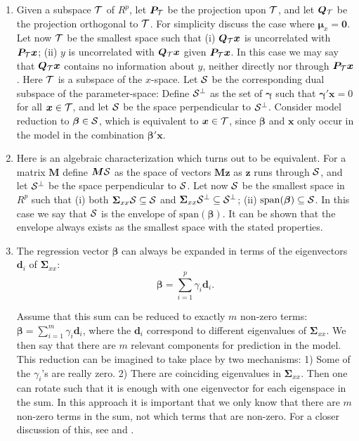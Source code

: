 \documentclass[a4paper, 11pt]{article}
\begin{document}
\begin{enumerate}[label=\Alph*.]

\item Given a subspace $\cal{T}$ of $R^p$, let $\bm{P}_{\cal{T}}$ be the projection upon $\cal{T}$, and let $\bm{Q}_{\cal{T}}$ be the projection orthogonal to $\cal{T}$. For simplicity discuss the case where $\bm{\mu}_x =\bm{0}$. Let now $\cal{T}$ be the smallest space such that (i) $\bm{Q}_{\cal{T}}\bm{x}$ is uncorrelated with $\bm{P}_{\cal{T}}\bm{x}$; (ii) $y$ is uncorrelated with $\bm{Q}_{\cal{T}}\bm{x}$ given $\bm{P}_{\cal{T}}\bm{x}$. In this case we may say that $\bm{Q}_{\cal{T}}\bm{x}$ contains no information about $y$, neither directly nor through $\bm{P}_{\cal{T}}\bm{x}$. Here $\cal{T}$ is a subspace of the $x$-space. Let $\cal{S}$ be the corresponding dual subspace of the parameter-space: Define $\cal{S}^\perp$ as the set of $\bm{\gamma}$ such that $\bm{\gamma}'\bm{x}=0$ for all $\bm{x}\in\cal{T}$, and let $\cal{S}$ be the space perpendicular to $\cal{S}^\perp$. Consider model reduction to $\bm{\beta}\in\cal{S}$, which is equivalent to $\bm{x}\in \cal{T}$, since $\bm{\beta}$ and $\bm{x}$ only occur in the model in the combination $\bm{\beta}'\bm{x}$.
  \smallskip

\item  Here is an algebraic characterization which turns out to be equivalent. For a matrix $\bm{M}$ define $\bm{M}\cal{S}$ as the space of vectors $\bm{Mz}$ as $\bm{z}$ runs through $\cal{S}$, and let $\cal{S}^\perp$ be
  the space perpendicular to $\cal{S}$. Let now $\cal{S}$ be the smallest space in $R^p$ such that (i) both $\bm{\Sigma}_{xx}\cal{S}\subseteq\cal{S}$ and
  $\bm{\Sigma}_{xx}\cal{S}^\perp\subseteq\cal{S}^\perp$; (ii) $\mathrm{span}(\bm{\beta})\subseteq\cal{S}$. In this case we say that $\cal{S}$
  is the envelope of $\mathrm{span}(\bm{\beta})$. It can be shown \citep{cook2010envelope} that the envelope always exists as the smallest space with the stated properties.
  \smallskip

\item The regression vector $\bm{\beta}$ can always be expanded in terms of the eigenvectors $\bm{d}_{i}$ of $\bm{\Sigma}_{xx}$:
\begin{equation}
  \bm{\beta}=\sum_{i=1}^p \gamma_{i}\bm{d}_{i}.
  \label{beta}
  \end{equation} 
  
Assume that this sum can be reduced to exactly $m$ non-zero terms:
  $\bm{\beta}=\sum_{i=1}^m \gamma_{i}\bm{d}_{i}$, where the $\bm{d}_i$ correspond to different eigenvalues of $\bm{\Sigma}_{xx}$. We then say that there are $m$ relevant components for prediction in the model. This reduction can be imagined to take place by two mechanisms: 1) Some of the $\gamma_i$'s are really zero. 2) There are coinciding eigenvalues in $\bm{\Sigma}_{xx}$. Then one can rotate such that it is enough with one eigenvector for each eigenspace in the sum. In this approach it is important that we only know that there are $m$ non-zero terms in the sum, not which  terms that are non-zero. For a closer discussion of this, see \citet{naes1993relevant} and \citet{helland1994comparison}.
  \smallskip


\end{enumerate}
\end{document}

